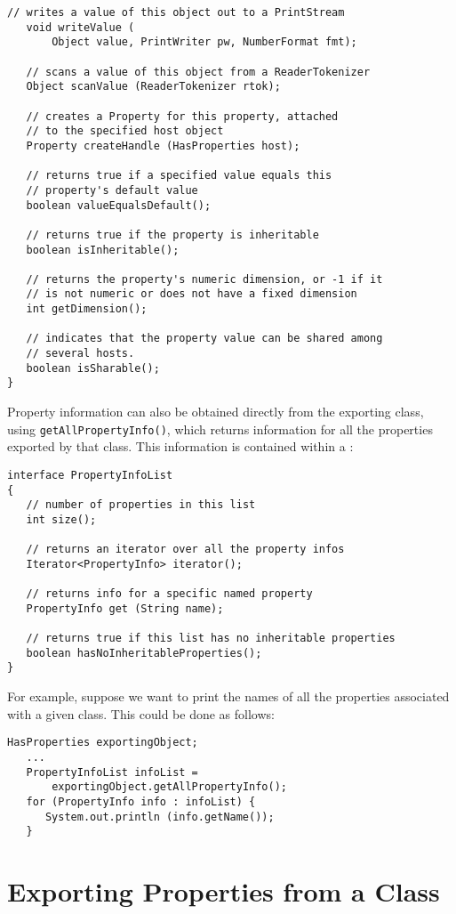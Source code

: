 \begin{lstlisting}[]
   // writes a value of this object out to a PrintStream
   void writeValue (
       Object value, PrintWriter pw, NumberFormat fmt);

   // scans a value of this object from a ReaderTokenizer
   Object scanValue (ReaderTokenizer rtok);

   // creates a Property for this property, attached
   // to the specified host object
   Property createHandle (HasProperties host);

   // returns true if a specified value equals this
   // property's default value
   boolean valueEqualsDefault();

   // returns true if the property is inheritable
   boolean isInheritable();

   // returns the property's numeric dimension, or -1 if it
   // is not numeric or does not have a fixed dimension
   int getDimension();

   // indicates that the property value can be shared among
   // several hosts.
   boolean isSharable();
}
\end{lstlisting}

Property information can also be obtained directly from the exporting
class, using {\tt getAllPropertyInfo()}, which returns
information for all the properties exported by that class. This
information is contained within a 
:
\begin{lstlisting}[]
interface PropertyInfoList
{
   // number of properties in this list
   int size(); 

   // returns an iterator over all the property infos
   Iterator<PropertyInfo> iterator();

   // returns info for a specific named property
   PropertyInfo get (String name);

   // returns true if this list has no inheritable properties
   boolean hasNoInheritableProperties();
}
\end{lstlisting}
For example, suppose we want to print the names of all the
properties associated with a given class. This could
be done as follows:
\begin{lstlisting}[]
   HasProperties exportingObject;
   ...
   PropertyInfoList infoList = 
       exportingObject.getAllPropertyInfo();
   for (PropertyInfo info : infoList) {
      System.out.println (info.getName());
   }
\end{lstlisting}

\label{exportingSec}
\section{Exporting Properties from a Class }

